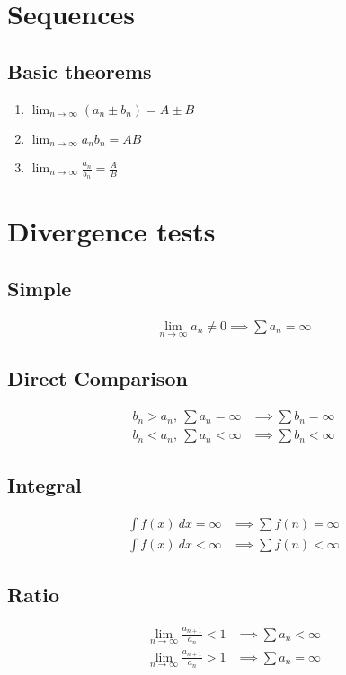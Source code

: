 \documentclass[12pt]{article}
\begin{document}
\begin{multicols}{2}
\section*{Sequences}

\subsection*{Basic theorems}
\begin{enumerate}
    \item $\lim_{n\to\infty} (a_n \pm b_n) = A \pm B$
    \item $\lim_{n\to\infty} a_n b_n = AB$
    \item $\lim_{n\to\infty} \frac{a_n}{b_n} = \frac{A}{B}$
\end{enumerate}



\section*{Divergence tests}

\subsection*{Simple}
\begin{align*}
    \lim_{n\to\infty} a_n \neq 0 \implies \sum a_n = \infty
\end{align*}

\subsection*{Direct Comparison}
\begin{align*}
    b_n > a_n,\ \sum a_n = \infty &\implies \sum b_n = \infty \\
    b_n < a_n,\ \sum a_n < \infty &\implies \sum b_n < \infty
\end{align*}

\subsection*{Integral}
\begin{align*}
    \int f(x)\ dx = \infty &\implies \sum f(n) = \infty \\
    \int f(x)\ dx < \infty &\implies \sum f(n) < \infty
\end{align*}

\subsection*{Ratio}
\begin{align*}
    \lim_{n\to\infty} \frac{a_{n+1}}{a_n} < 1 &\implies \sum a_n < \infty\\
    \lim_{n\to\infty} \frac{a_{n+1}}{a_n} > 1 &\implies \sum a_n = \infty
\end{align*}


\end{multicols}
\end{document}
